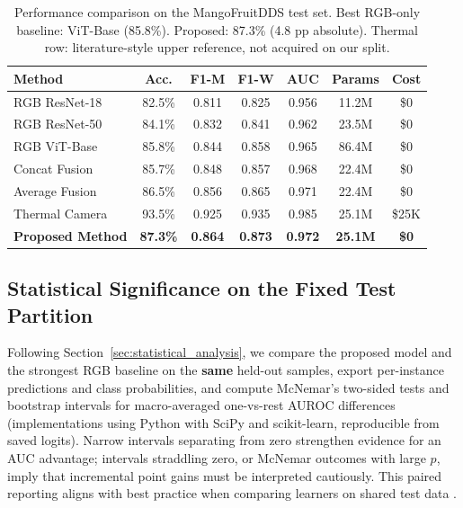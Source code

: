 \documentclass[utf8]{FrontiersinHarvard} %
\begin{document}
\begin{table}[h!]
    \caption{Performance comparison on the MangoFruitDDS test set. Best RGB-only baseline: ViT-Base (85.8\%). Proposed: 87.3\% (4.8 pp absolute). Thermal row: literature-style upper reference, not acquired on our split.}
    \label{tab:performance}
    \raggedright
    \scriptsize
    \begin{tabular}{lcccccc}
        \toprule
        \textbf{Method} & \textbf{Acc.} & \textbf{F1-M} & \textbf{F1-W} & \textbf{AUC} & \textbf{Params} & \textbf{Cost} \\
        \midrule
        RGB ResNet-18 & 82.5\% & 0.811 & 0.825 & 0.956 & 11.2M & \$0 \\
        RGB ResNet-50 & 84.1\% & 0.832 & 0.841 & 0.962 & 23.5M & \$0 \\
        RGB ViT-Base & 85.8\% & 0.844 & 0.858 & 0.965 & 86.4M & \$0 \\
        Concat Fusion & 85.7\% & 0.848 & 0.857 & 0.968 & 22.4M & \$0 \\
        Average Fusion & 86.5\% & 0.856 & 0.865 & 0.971 & 22.4M & \$0 \\
        Thermal Camera & 93.5\% & 0.925 & 0.935 & 0.985 & 25.1M & \$25K \\
        \rowcolor{green!20}
        \textbf{Proposed Method} & \textbf{87.3\%} & \textbf{0.864} & \textbf{0.873} & \textbf{0.972} & \textbf{25.1M} & \textbf{\$0} \\
        \bottomrule
    \end{tabular}
\end{table}

\subsection{Statistical Significance on the Fixed Test Partition}
Following Section~\ref{sec:statistical_analysis}, we compare the proposed model and the strongest RGB baseline on the \textbf{same} held-out samples, export per-instance predictions and class probabilities, and compute McNemar's two-sided tests and bootstrap intervals for macro-averaged one-vs-rest AUROC differences (implementations using Python with SciPy and scikit-learn, reproducible from saved logits). Narrow intervals separating from zero strengthen evidence for an AUC advantage; intervals straddling zero, or McNemar outcomes with large $p$, imply that incremental point gains must be interpreted cautiously. This paired reporting aligns with best practice when comparing learners on shared test data \cite{dietterich1998}.
\end{document}
